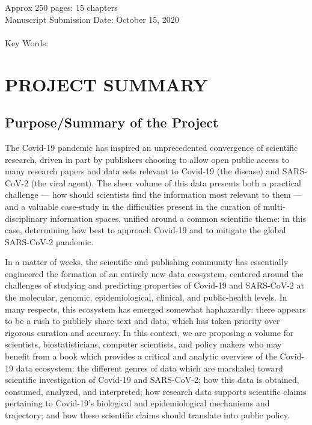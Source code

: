 \documentclass{statsoc}
\title[Cross-Disciplinary Data Integration for Covid-19]{
Cross-Disciplinary Data Integration Models \\for the New Covid-19 Data Ecosystem
\end{center}
}
\author[Amy Neustein]{Amy Neustein}
\author[Amy Neustein]{Nathaniel Christen}
\newcommand{\p}[1]{

\vspace{.75em}#1}
\begin{document}
\vspace{1em}
\noindent{}Approx 250 pages: 15 chapters\\
Manuscript Submission Date: October 15, 2020\\
\\
Key Words: {\fontsize{10}{21}}


\vspace{1em}

{\fontsize{10}{14}\selectfont
\section{PROJECT SUMMARY}

\subsection{Purpose/Summary of the Project}
\p{The Covid-19 pandemic has inspired an unprecedented 
convergence of scientific research, driven in part 
by publishers choosing to allow open public access 
to many research papers and data sets 
relevant to Covid-19 (the disease) and SARS-CoV-2 
(the viral agent).  The sheer volume of this data 
presents both a practical challenge --- how should 
scientists find the information most relevant to them 
--- and a valuable case-study in the difficulties present 
in the curation of multi-disciplinary 
information spaces, unified around a common 
scientific theme: in this case, 
determining how best to approach Covid-19 and to 
mitigate the global SARS-CoV-2 pandemic.}

\p{In a matter of weeks, the scientific and publishing 
community has essentially engineered the formation of 
an entirely new data ecosystem, centered around the 
challenges of studying and predicting properties 
of Covid-19 and SARS-CoV-2 at the molecular, genomic, 
epidemiological, clinical, and public-health levels.  
In many respects, this ecosystem has emerged somewhat 
haphazardly: there appears to be a rush to publicly 
share text and data, which has taken priority over 
rigorous curation and accuracy.  In this context, 
we are proposing a volume for scientists, 
biostatisticians, computer 
scientists, and policy makers who may benefit from a 
book which provides a critical and analytic 
overview of the Covid-19 data ecosystem: the 
different genres of data which are marshaled 
toward scientific investigation of Covid-19 
and SARS-CoV-2; how this data is obtained, 
consumed, analyzed, and interpreted; how 
research data supports scientific claims 
pertaining to Covid-19's biological and 
epidemiological mechanisms and trajectory; 
and how these scientific claims should 
translate into public policy.} 

}
\end{document}

